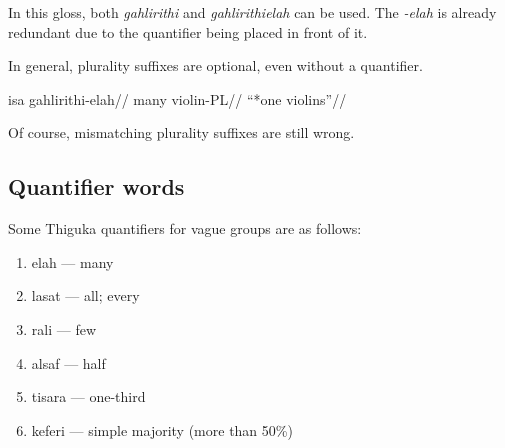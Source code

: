 In this gloss, both \textit{gahlirithi} and \textit{gahlirithielah} can be used.
The \textit{-elah} is already redundant due to the quantifier being placed in front of it.

In general, plurality suffixes are optional, even without a quantifier.

\ex
\begingl
    \gla  isa  gahlirithi-elah//
    \glb  many violin-PL//
    \glft ``*one violins''//
\endgl
\xe

Of course, mismatching plurality suffixes are still wrong.

\subsection*{Quantifier words}

Some Thiguka quantifiers for vague groups are as follows:
\begin{enumerate}
    \item elah --- many
    \item lasat --- all; every
    \item rali --- few
    \item alsaf --- half
    \item tisara --- one-third
    \item keferi --- simple majority (more than 50\%{})
          
\end{enumerate}
